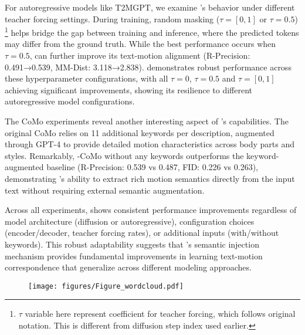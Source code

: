 For autoregressive models like T2MGPT, we examine {\modulename}'s behavior under different teacher forcing settings. During training, random masking ($\tau=[0,1]$ or $\tau=0.5$) \footnote{$\tau$ variable here represent coefficient for teacher forcing, which follows original notation. This is different from diffusion step index used earlier.} helps bridge the gap between training and inference, where the predicted tokens may differ from the ground truth. 
While the best performance occurs when $\tau=0.5$, {\modulename} can further improve its text-motion alignment (R-Precision: 0.491→0.539, MM-Dist: 3.118→2.838).
{\modulename} demonstrates robust performance across these hyperparameter configurations,
with all $\tau=0$, $\tau=0.5$ and $\tau = [0,1]$ 
achieving significant improvements, showing its resilience to different autoregressive model configurations.

The CoMo experiments reveal another interesting aspect of {\modulename}'s capabilities. 
The original CoMo relies on 11 additional keywords per description, augmented through GPT-4 to provide detailed motion characteristics across body parts and styles. 
Remarkably, {\modulename}-CoMo without any keywords outperforms the keyword-augmented baseline (R-Precision: 0.539 vs 0.487, FID: 0.226 vs 0.263), demonstrating {\modulename}'s ability to extract rich motion semantics directly from the input text without requiring external semantic augmentation.

Across all experiments, {\modulename} shows consistent performance improvements regardless of model architecture (diffusion or autoregressive), configuration choices (encoder/decoder, teacher forcing rates), or additional inputs (with/without keywords). This robust adaptability suggests that {\modulename}'s semantic injection mechanism provides fundamental improvements in learning text-motion correspondence that generalize across different modeling approaches.


\begin{figure}[!t]
    \centering
    \texttt{[image: figures/Figure\_wordcloud.pdf]}
    \vspace{-20pt}
    \vspace{-10pt}
\label{fig:wordcloud}
\end{figure}

